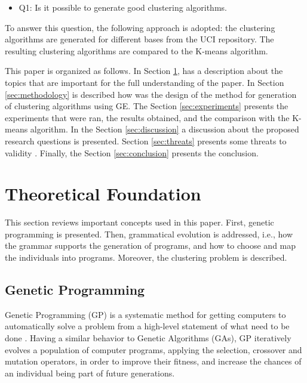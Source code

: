 \documentclass[journal]{IEEEtran}
\begin{document}
	\begin{itemize}
		\item Q1: Is it possible to generate good clustering algorithms.
	\end{itemize}
	
	To answer this question, the following approach is adopted: the clustering algorithms are generated for different bases from the UCI repository. The resulting clustering algorithms are  compared to the K-means algorithm. 
	
	This paper is organized as follows. In Section \ref{sec:theoretical_foudation}, has a description about the topics that are important for the full understanding of the paper. In Section \ref{sec:methodology} is described how was the design of the method for generation of clustering algorithms using GE. The Section \ref{sec:experiments} presents the experiments that were ran, the results obtained, and the comparison with the K-means algorithm. In the Section \ref{sec:discussion} a discussion about the proposed research questions is presented. Section \ref{sec:threats} presents some threats to validity . Finally, the Section \ref{sec:conclusion} presents the conclusion.
	
	
	\section{Theoretical Foundation} \label{sec:theoretical_foudation}
	
	This section reviews important concepts used in this paper. First, genetic programming is presented. Then, grammatical evolution is addressed, i.e., how the grammar supports the generation of programs, and how to choose and map the individuals into programs. Moreover, the clustering problem is described.
	
	
	\subsection{Genetic Programming}
	
	Genetic Programming (GP) is a systematic method for getting computers to automatically solve a problem from a high-level statement of what need to be done \cite{koza2005genetic}. Having a similar behavior to Genetic Algorithms (GAs), GP iteratively evolves a population of computer programs, applying the selection, crossover and mutation operators, in order to improve their fitness, and increase the chances of an individual being part of future generations.
	
\end{document}
